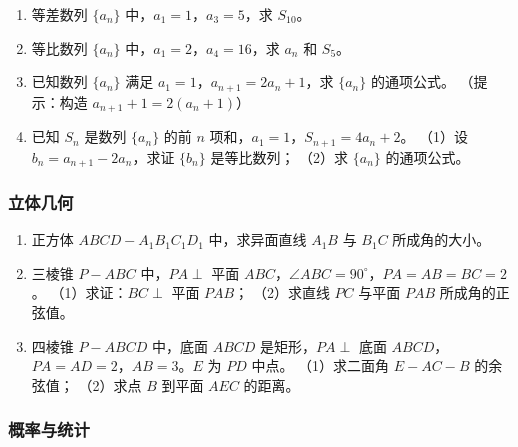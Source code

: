\begin{enumerate}
  \item[★] 等差数列 $\{a_n\}$ 中，$a_1=1$，$a_3=5$，求 $S_{10}$。
  \vspace{1cm}

  \item[★] 等比数列 $\{a_n\}$ 中，$a_1=2$，$a_4=16$，求 $a_n$ 和 $S_5$。
  \vspace{1cm}

  \item[★★] 已知数列 $\{a_n\}$ 满足 $a_1=1$，$a_{n+1}=2a_n+1$，求 $\{a_n\}$ 的通项公式。
  （提示：构造 $a_{n+1}+1 = 2(a_n+1)$）
  \vspace{1.5cm}

  \item[★★] 已知 $S_n$ 是数列 $\{a_n\}$ 的前 $n$ 项和，$a_1=1$，$S_{n+1}=4a_n+2$。
  （1）设 $b_n = a_{n+1} - 2a_n$，求证 $\{b_n\}$ 是等比数列；
  （2）求 $\{a_n\}$ 的通项公式。
  \vspace{2cm}
\end{enumerate}

\subsubsection{立体几何}

\begin{enumerate}
  \item[★] 正方体 $ABCD-A_1B_1C_1D_1$ 中，求异面直线 $A_1B$ 与 $B_1C$ 所成角的大小。
  \vspace{1cm}

  \item[★★] 三棱锥 $P-ABC$ 中，$PA\perp$ 平面 $ABC$，$\angle ABC=90^\circ$，$PA=AB=BC=2$。
  （1）求证：$BC\perp$ 平面 $PAB$；
  （2）求直线 $PC$ 与平面 $PAB$ 所成角的正弦值。
  \vspace{2cm}

  \item[★★] 四棱锥 $P-ABCD$ 中，底面 $ABCD$ 是矩形，$PA\perp$ 底面 $ABCD$，
  $PA=AD=2$，$AB=3$。$E$ 为 $PD$ 中点。
  （1）求二面角 $E-AC-B$ 的余弦值；
  （2）求点 $B$ 到平面 $AEC$ 的距离。
  \vspace{2cm}
\end{enumerate}

\subsubsection{概率与统计}

